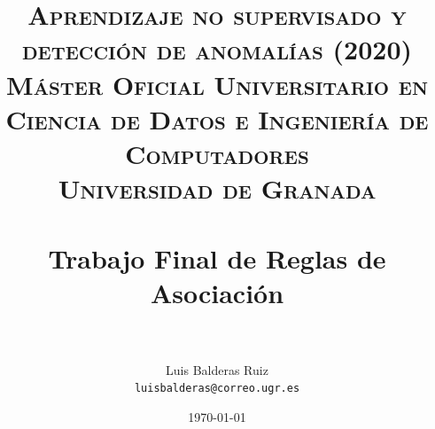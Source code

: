 
\graphicspath{ {./images/} }
\usepackage{subcaption}
\usepackage{hyperref}
\usepackage{soul}



\title{	
\normalfont \normalsize 
\textsc{\textbf{Aprendizaje no supervisado y detección de anomalías (2020)} \\ Máster Oficial Universitario en Ciencia de Datos e Ingeniería de Computadores \\ Universidad de Granada} \\ [25pt] %
\horrule{0.5pt} \\[0.4cm] %
\huge Trabajo Final de Reglas de Asociación \\ %
\horrule{2pt} \\[0.5cm] %
}

\author{Luis Balderas Ruiz \\ \texttt{luisbalderas@correo.ugr.es}} 


\date{\normalsize\today} %




\maketitle %

\newpage %

\tableofcontents %

\listoffigures

\listoftables

\newpage


